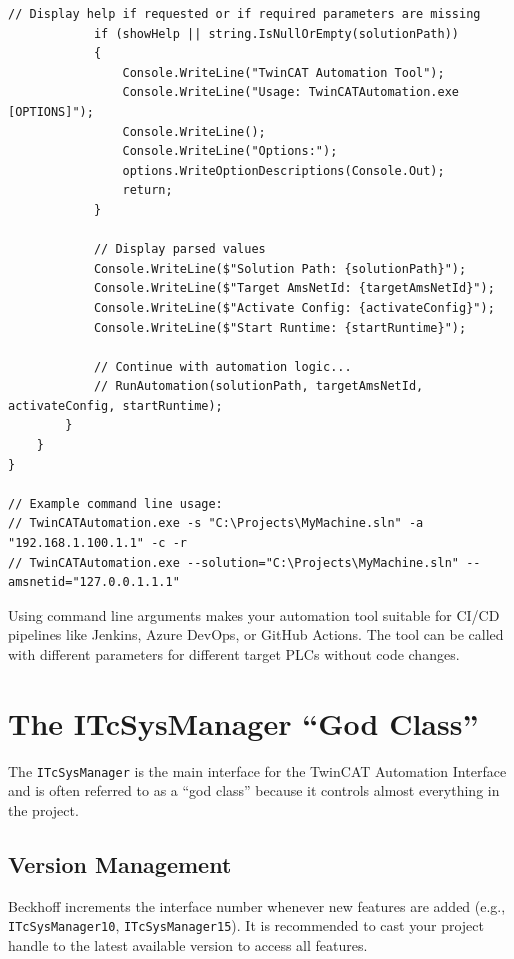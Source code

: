 \documentclass[11pt,a4paper]{article}
\begin{document}
\begin{lstlisting}[style=csharpstyle]
            // Display help if requested or if required parameters are missing
            if (showHelp || string.IsNullOrEmpty(solutionPath))
            {
                Console.WriteLine("TwinCAT Automation Tool");
                Console.WriteLine("Usage: TwinCATAutomation.exe [OPTIONS]");
                Console.WriteLine();
                Console.WriteLine("Options:");
                options.WriteOptionDescriptions(Console.Out);
                return;
            }
            
            // Display parsed values
            Console.WriteLine($"Solution Path: {solutionPath}");
            Console.WriteLine($"Target AmsNetId: {targetAmsNetId}");
            Console.WriteLine($"Activate Config: {activateConfig}");
            Console.WriteLine($"Start Runtime: {startRuntime}");
            
            // Continue with automation logic...
            // RunAutomation(solutionPath, targetAmsNetId, activateConfig, startRuntime);
        }
    }
}

// Example command line usage:
// TwinCATAutomation.exe -s "C:\Projects\MyMachine.sln" -a "192.168.1.100.1.1" -c -r
// TwinCATAutomation.exe --solution="C:\Projects\MyMachine.sln" --amsnetid="127.0.0.1.1.1"
\end{lstlisting}

\begin{tipbox}
Using command line arguments makes your automation tool suitable for CI/CD pipelines like Jenkins, Azure DevOps, or GitHub Actions. The tool can be called with different parameters for different target PLCs without code changes.
\end{tipbox}

\section{The ITcSysManager ``God Class''}

The \texttt{ITcSysManager} is the main interface for the TwinCAT Automation Interface and is often referred to as a ``god class'' because it controls almost everything in the project.

\subsection{Version Management}

Beckhoff increments the interface number whenever new features are added (e.g., \texttt{ITcSysManager10}, \texttt{ITcSysManager15}). It is recommended to cast your project handle to the latest available version to access all features.
\end{document}
